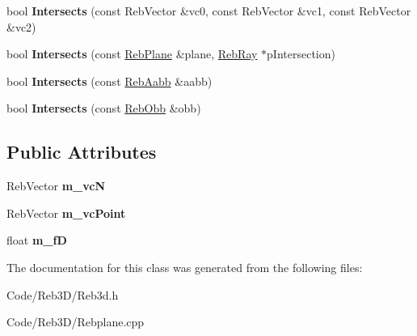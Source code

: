 \begin{DoxyCompactItemize}
\item 
bool {\bfseries Intersects} (const Reb\+Vector \&vc0, const Reb\+Vector \&vc1, const Reb\+Vector \&vc2)\hypertarget{class_reb_plane_a052757ce1cd4fc1e2e6faebb7c02b1eb}{}\label{class_reb_plane_a052757ce1cd4fc1e2e6faebb7c02b1eb}

\item 
bool {\bfseries Intersects} (const \hyperlink{class_reb_plane}{Reb\+Plane} \&plane, \hyperlink{class_reb_ray}{Reb\+Ray} $\ast$p\+Intersection)\hypertarget{class_reb_plane_a80ecf2208cb498cad89aacb6bab69d7d}{}\label{class_reb_plane_a80ecf2208cb498cad89aacb6bab69d7d}

\item 
bool {\bfseries Intersects} (const \hyperlink{class_reb_aabb}{Reb\+Aabb} \&aabb)\hypertarget{class_reb_plane_a5464bace241e6d8d95e32a0bd9d4a49a}{}\label{class_reb_plane_a5464bace241e6d8d95e32a0bd9d4a49a}

\item 
bool {\bfseries Intersects} (const \hyperlink{class_reb_obb}{Reb\+Obb} \&obb)\hypertarget{class_reb_plane_a70a17cc792abb1fd6eb12b620fabb1ba}{}\label{class_reb_plane_a70a17cc792abb1fd6eb12b620fabb1ba}

\end{DoxyCompactItemize}
\subsection*{Public Attributes}
\begin{DoxyCompactItemize}
\item 
Reb\+Vector {\bfseries m\+\_\+vcN}\hypertarget{class_reb_plane_a372ed7e16f1dd8a0fbcf304ce22cef22}{}\label{class_reb_plane_a372ed7e16f1dd8a0fbcf304ce22cef22}

\item 
Reb\+Vector {\bfseries m\+\_\+vc\+Point}\hypertarget{class_reb_plane_a791fe80ce281a0309f0f06c3a0f29625}{}\label{class_reb_plane_a791fe80ce281a0309f0f06c3a0f29625}

\item 
float {\bfseries m\+\_\+fD}\hypertarget{class_reb_plane_abb401f1c50d039f8c805d6f0571e239a}{}\label{class_reb_plane_abb401f1c50d039f8c805d6f0571e239a}

\end{DoxyCompactItemize}


The documentation for this class was generated from the following files\+:\begin{DoxyCompactItemize}
\item 
Code/\+Reb3\+D/Reb3d.\+h\item 
Code/\+Reb3\+D/Rebplane.\+cpp\end{DoxyCompactItemize}
